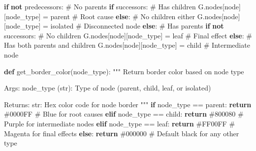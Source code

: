 \documentclass[
  11pt,
  letterpaper,
]{book}
\newenvironment{Shaded}{\begin{snugshade}}{\end{snugshade}}
\newcommand{\CommentTok}[1]{\textcolor[rgb]{0.37,0.37,0.37}{#1}}
\newcommand{\ControlFlowTok}[1]{\textcolor[rgb]{0.00,0.23,0.31}{\textbf{#1}}}
\newcommand{\KeywordTok}[1]{\textcolor[rgb]{0.00,0.23,0.31}{\textbf{#1}}}
\newcommand{\NormalTok}[1]{\textcolor[rgb]{0.00,0.23,0.31}{#1}}
\newcommand{\OperatorTok}[1]{\textcolor[rgb]{0.37,0.37,0.37}{#1}}
\newcommand{\StringTok}[1]{\textcolor[rgb]{0.13,0.47,0.30}{#1}}
\begin{document}
\begin{Shaded}
\begin{Highlighting}[]
        \ControlFlowTok{if} \KeywordTok{not}\NormalTok{ predecessors:  }\CommentTok{\# No parents}
            \ControlFlowTok{if}\NormalTok{ successors:  }\CommentTok{\# Has children}
\NormalTok{                G.nodes[node][}\StringTok{\textquotesingle{}node\_type\textquotesingle{}}\NormalTok{] }\OperatorTok{=} \StringTok{\textquotesingle{}parent\textquotesingle{}}  \CommentTok{\# Root cause}
            \ControlFlowTok{else}\NormalTok{:  }\CommentTok{\# No children either}
\NormalTok{                G.nodes[node][}\StringTok{\textquotesingle{}node\_type\textquotesingle{}}\NormalTok{] }\OperatorTok{=} \StringTok{\textquotesingle{}isolated\textquotesingle{}}  \CommentTok{\# Disconnected node}
        \ControlFlowTok{else}\NormalTok{:  }\CommentTok{\# Has parents}
            \ControlFlowTok{if} \KeywordTok{not}\NormalTok{ successors:  }\CommentTok{\# No children}
\NormalTok{                G.nodes[node][}\StringTok{\textquotesingle{}node\_type\textquotesingle{}}\NormalTok{] }\OperatorTok{=} \StringTok{\textquotesingle{}leaf\textquotesingle{}}  \CommentTok{\# Final effect}
            \ControlFlowTok{else}\NormalTok{:  }\CommentTok{\# Has both parents and children}
\NormalTok{                G.nodes[node][}\StringTok{\textquotesingle{}node\_type\textquotesingle{}}\NormalTok{] }\OperatorTok{=} \StringTok{\textquotesingle{}child\textquotesingle{}}  \CommentTok{\# Intermediate node}

\KeywordTok{def}\NormalTok{ get\_border\_color(node\_type):}
    \CommentTok{"""}
\CommentTok{    Return border color based on node type}

\CommentTok{    Args:}
\CommentTok{        node\_type (str): Type of node (\textquotesingle{}parent\textquotesingle{}, \textquotesingle{}child\textquotesingle{}, \textquotesingle{}leaf\textquotesingle{}, or \textquotesingle{}isolated\textquotesingle{})}

\CommentTok{    Returns:}
\CommentTok{        str: Hex color code for node border}
\CommentTok{    """}
    \ControlFlowTok{if}\NormalTok{ node\_type }\OperatorTok{==} \StringTok{\textquotesingle{}parent\textquotesingle{}}\NormalTok{:}
        \ControlFlowTok{return} \StringTok{\textquotesingle{}\#0000FF\textquotesingle{}}  \CommentTok{\# Blue for root causes}
    \ControlFlowTok{elif}\NormalTok{ node\_type }\OperatorTok{==} \StringTok{\textquotesingle{}child\textquotesingle{}}\NormalTok{:}
        \ControlFlowTok{return} \StringTok{\textquotesingle{}\#800080\textquotesingle{}}  \CommentTok{\# Purple for intermediate nodes}
    \ControlFlowTok{elif}\NormalTok{ node\_type }\OperatorTok{==} \StringTok{\textquotesingle{}leaf\textquotesingle{}}\NormalTok{:}
        \ControlFlowTok{return} \StringTok{\textquotesingle{}\#FF00FF\textquotesingle{}}  \CommentTok{\# Magenta for final effects}
    \ControlFlowTok{else}\NormalTok{:}
        \ControlFlowTok{return} \StringTok{\textquotesingle{}\#000000\textquotesingle{}}  \CommentTok{\# Default black for any other type}


\end{Highlighting}
\end{Shaded}
\end{document}
